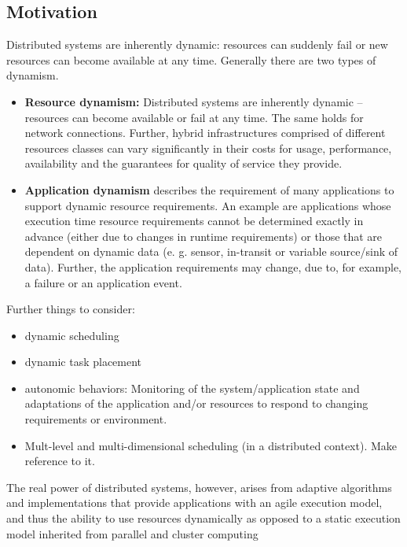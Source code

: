 \documentclass[]{article}
\begin{document}
\subsection{Motivation}

Distributed systems are inherently dynamic: resources can suddenly fail or 
new resources can become available at any time. Generally there are two types
of dynamism.
\begin{itemize}
\item \textbf{Resource dynamism:} Distributed systems are inherently dynamic
     -- resources can become available or fail at any time. The same holds for
      network connections. Further, hybrid infrastructures comprised of 
      different resources classes can vary significantly in their costs for 
      usage, performance, availability and the guarantees for quality of service 
      they provide.
      
\item \textbf{Application dynamism} describes the requirement of many
applications to support dynamic resource requirements. An example are
applications whose execution time resource requirements cannot be determined
exactly in advance (either due to changes in runtime requirements) or those that
are dependent on dynamic data (e. g. sensor, in-transit or variable source/sink
of data). Further, the application requirements may change, due to,
for example, a failure or an application event.
\end{itemize}

Further things to consider:
\begin{itemize}
    \item dynamic scheduling
    \item dynamic task placement
    \item autonomic behaviors: Monitoring of the system/application state and 
    adaptations of the application and/or resources to respond to changing 
    requirements or environment.
  \item Mult-level and multi-dimensional scheduling (in a distributed
    context). Make reference to it.
\end{itemize}

The real power of distributed systems, however, arises from adaptive algorithms
and implementations that provide applications with an agile execution model, and
thus the ability to use resources dynamically as opposed to a static execution
model inherited from parallel and cluster computing
\end{document}
